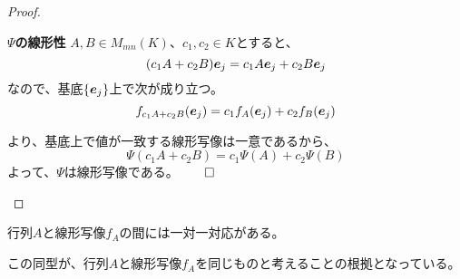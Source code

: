 \documentclass[../../../topic_linear-algebra]{subfiles}
\begin{document}
\begin{proof}
  \begin{subpattern}{\bfseries $\Psi$の線形性}
    $A,B\in M_{mn}(K)$、$c_1,c_2\in K$とすると、
  \begin{equation*}
    (c_1 A+c_2 B)\vb*{e}_j = c_1 A\vb*{e}_j + c_2 B\vb*{e}_j
  \end{equation*}
  なので、基底$\{\vb*{e}_j\}$上で次が成り立つ。
  \begin{equation*}
    f_{c_1 A+c_2 B}(\vb*{e}_j) = c_1 f_A(\vb*{e}_j) + c_2 f_B(\vb*{e}_j)
  \end{equation*}
  
  より、基底上で値が一致する線形写像は一意であるから、
  \begin{equation*}
    \Psi(c_1 A+c_2 B)=c_1 \Psi(A)+c_2 \Psi(B)
  \end{equation*}
  よって、$\Psi$は線形写像である。$\qed$
  \end{subpattern}  
\end{proof}

\br

行列$A$と線形写像$f_A$の間には一対一対応がある。

この同型が、行列$A$と線形写像$f_A$を同じものと考えることの根拠となっている。
\end{document}
